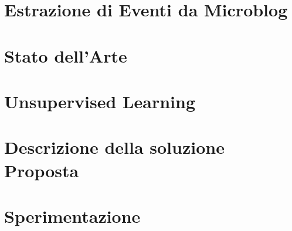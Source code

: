 \documentclass[a4paper,12pt,oneside]{book}
\begin{document}
\chapter{Estrazione di Eventi da Microblog}
\label{cap:capitolo1}



\chapter{Stato dell'Arte}
\label{cap:capitolo2}




\chapter{Unsupervised Learning}
\label{cap:capitolo3}



\chapter{Descrizione della soluzione Proposta}
\label{cap:capitolo4}


\chapter{Sperimentazione}
\label{cap:capitolo5}



%
%
%

\end{document}
